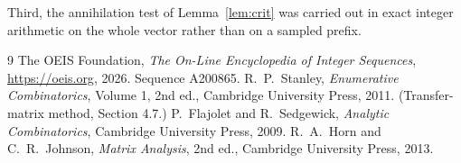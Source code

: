 \documentclass[11pt,a4paper]{article}
\theoremstyle{plain}
\theoremstyle{definition}
\begin{document}
Third, the annihilation test of Lemma~\ref{lem:crit} was carried out in exact integer
arithmetic on the whole vector rather than on a sampled prefix.

\begin{thebibliography}{9}
 The OEIS Foundation, \emph{The On-Line Encyclopedia of Integer
Sequences}, \url{https://oeis.org}, 2026. Sequence A200865.
 R.~P.~Stanley, \emph{Enumerative Combinatorics}, Volume 1, 2nd ed.,
Cambridge University Press, 2011. (Transfer-matrix method, Section 4.7.)
 P.~Flajolet and R.~Sedgewick, \emph{Analytic Combinatorics}, Cambridge
University Press, 2009.
 R.~A.~Horn and C.~R.~Johnson, \emph{Matrix Analysis}, 2nd ed., Cambridge
University Press, 2013.
\end{thebibliography}
\end{document}
